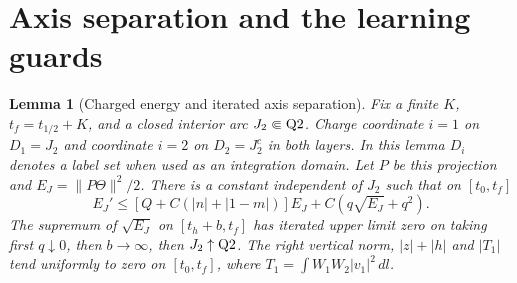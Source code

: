 \documentclass[11pt]{article}
\newtheorem{lemma}{Lemma}
\newcommand{\dd}{\,dl}
\begin{document}
\section{Axis separation and the learning guards}\label{an04e5rv1:guards}
\begin{lemma}[Charged energy and iterated axis separation]\label{an04e5rv1:axislemma}
Fix a finite $K$, $t_f=t_{1/2}+K$, and a closed interior arc $J_2\Subset{\rm Q2}$.
Charge coordinate $i=1$ on $D_1=J_2$ and coordinate $i=2$ on $D_2=J_2^c$ in both layers. In this lemma $D_i$ denotes a label set when used as an integration domain. Let $P$ be this projection and $E_J=\|P\Theta\|^2/2$. There is a constant independent of $J_2$ such that on $[t_0,t_f]$
\begin{equation}\label{an04e5rv1:defect}
 E_J'\le [Q+C(|n|+|1-m|)]E_J+C(q\sqrt{E_J}+q^2).
\end{equation}
The supremum of $\sqrt{E_J}$ on $[t_h+b,t_f]$ has iterated upper limit zero on taking first $q\downarrow0$, then $b\to\infty$, then $J_2\uparrow{\rm Q2}$. The right vertical norm, $|z|+|h|$ and $|T_1|$ tend uniformly to zero on $[t_0,t_f]$, where $T_1=\int W_1W_2|v_1|^2\dd$.
\end{lemma}
\end{document}
